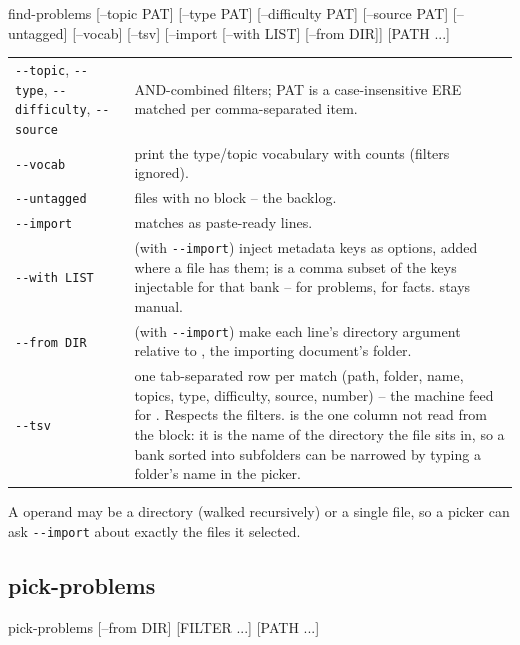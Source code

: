 \begin{manexsource}
find-problems [--topic PAT] [--type PAT] [--difficulty PAT]
              [--source PAT] [--untagged] [--vocab] [--tsv]
              [--import [--with LIST] [--from DIR]] [PATH ...]
\end{manexsource}

\begin{center}
\begin{tabularx}{\linewidth}{@{}l Y@{}}
\texttt{-{}-topic}, \texttt{-{}-type}, \texttt{-{}-difficulty},
  \texttt{-{}-source} & AND-combined filters; PAT is a case-insensitive
  ERE matched per comma-separated item.\\
\texttt{-{}-vocab} & print the type/topic vocabulary with counts (filters
  ignored).\\
\texttt{-{}-untagged} & files with no  block -- the
  backlog.\\
\texttt{-{}-import} & matches as paste-ready  lines.\\
\texttt{-{}-with LIST} & (with \texttt{-{}-import}) inject metadata keys as
  options, added where a file has them;  is a comma subset of the
  keys injectable for that bank --  for problems,
   for facts.  stays manual.\\
\texttt{-{}-from DIR} & (with \texttt{-{}-import}) make each line's directory
  argument relative to , the importing document's folder.\\
\texttt{-{}-tsv} & one tab-separated row per match
  (path, folder, name, topics, type, difficulty, source, number) -- the machine
  feed for . Respects the filters.  is the one
  column not read from the block: it is the name of the directory the file sits
  in, so a bank sorted into subfolders can be narrowed by typing a folder's
  name in the picker.\\
\end{tabularx}
\end{center}

A  operand may be a directory (walked recursively) or a single
 file, so a picker can ask \texttt{-{}-import} about exactly the
files it selected.

\subsection*{pick-problems}

\begin{manexsource}
pick-problems [--from DIR] [FILTER ...] [PATH ...]
\end{manexsource}

